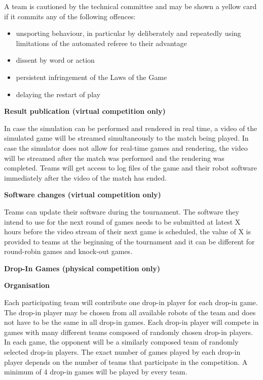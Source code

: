 A team is cautioned by the technical committee and may be shown a yellow
  card if it commits any of the following offences:


\begin{itemize}
\item unsporting behaviour, in particular by deliberately and repeatedly
    using limitations of the automated referee to their advantage
\item dissent by word or action
\item persistent infringement of the Laws of the Game
\item delaying the restart of play
\end{itemize}


\bigskip

{\bfseries Result publication (virtual competition only)}

In case the simulation can be performed and rendered in real time, a video of the simulated game will be streamed simultaneously to the match being played. In case the simulator does not allow for real-time games and rendering, the video will be streamed after the match was performed and the rendering was completed. Teams will get access to log files of the game and their robot software immediately after the video of the match has ended.

\bigskip

{\bfseries Software changes (virtual competition only)}

Teams can update their software during the tournament.
  The software they intend to use for the next round of games needs to be
  submitted at latest X hours before the video stream of their next game is
  scheduled, the value of X is provided to teams at the beginning of the
  tournament and it can be different for round-robin games and knock-out
  games.


\bigskip

{\bfseries Drop-In Games (physical competition only)}

\headlinebox

{\bfseries Organisation}

Each participating team will contribute one drop-in player for each drop-in game.
The drop-in player may be chosen from all available robots of the team and does
not have to be the same in all drop-in games.
Each drop-in player will compete in games with many different teams composed of
randomly chosen drop-in players.
In each game, the opponent will be a similarly composed team of randomly
selected drop-in players.
The exact number of games played by each drop-in player depends on the number of
teams that participate in the competition.
A minimum of 4 drop-in games will be played by every team.

